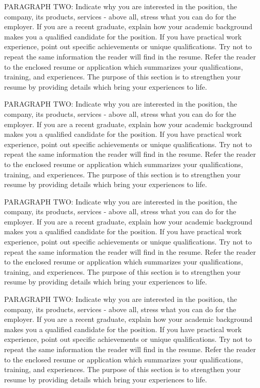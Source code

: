 \documentclass[12pt]{SCUletter}
\begin{document}
\begin{letter}
		PARAGRAPH TWO: Indicate why you are interested in the position, the company, its products, services - above all, stress what you can do for the employer. If you are a recent graduate, explain how your academic background makes you a qualified candidate for the position. If you have practical work experience, point out specific achievements or unique qualifications. Try not to repeat the same information the reader will find in the resume. Refer the reader to the enclosed resume or application which summarizes your qualifications, training, and experiences. The purpose of this section is to strengthen your resume by providing details which bring your experiences to life.
		
		PARAGRAPH TWO: Indicate why you are interested in the position, the company, its products, services - above all, stress what you can do for the employer. If you are a recent graduate, explain how your academic background makes you a qualified candidate for the position. If you have practical work experience, point out specific achievements or unique qualifications. Try not to repeat the same information the reader will find in the resume. Refer the reader to the enclosed resume or application which summarizes your qualifications, training, and experiences. The purpose of this section is to strengthen your resume by providing details which bring your experiences to life. 
		
		PARAGRAPH TWO: Indicate why you are interested in the position, the company, its products, services - above all, stress what you can do for the employer. If you are a recent graduate, explain how your academic background makes you a qualified candidate for the position. If you have practical work experience, point out specific achievements or unique qualifications. Try not to repeat the same information the reader will find in the resume. Refer the reader to the enclosed resume or application which summarizes your qualifications, training, and experiences. The purpose of this section is to strengthen your resume by providing details which bring your experiences to life.
		
		PARAGRAPH TWO: Indicate why you are interested in the position, the company, its products, services - above all, stress what you can do for the employer. If you are a recent graduate, explain how your academic background makes you a qualified candidate for the position. If you have practical work experience, point out specific achievements or unique qualifications. Try not to repeat the same information the reader will find in the resume. Refer the reader to the enclosed resume or application which summarizes your qualifications, training, and experiences. The purpose of this section is to strengthen your resume by providing details which bring your experiences to life. 
		

\end{letter}
\end{document}
